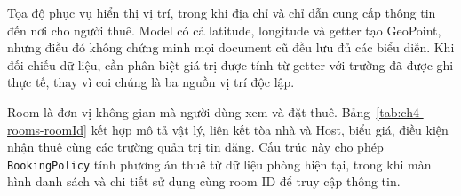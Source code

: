 Tọa độ phục vụ hiển thị vị trí, trong khi địa chỉ và chỉ dẫn cung cấp thông tin đến nơi cho người thuê. Model có cả latitude, longitude và getter tạo GeoPoint, nhưng điều đó không chứng minh mọi document cũ đều lưu đủ các biểu diễn. Khi đối chiếu dữ liệu, cần phân biệt giá trị được tính từ getter với trường đã được ghi thực tế, thay vì coi chúng là ba nguồn vị trí độc lập.

Room là đơn vị không gian mà người dùng xem và đặt thuê. Bảng~\ref{tab:ch4-rooms-roomId} kết hợp mô tả vật lý, liên kết tòa nhà và Host, biểu giá, điều kiện nhận thuê cùng các trường quản trị tin đăng. Cấu trúc này cho phép \texttt{Booking\allowbreak{}Policy} tính phương án thuê từ dữ liệu phòng hiện tại, trong khi màn hình danh sách và chi tiết sử dụng cùng room ID để truy cập thông tin.

